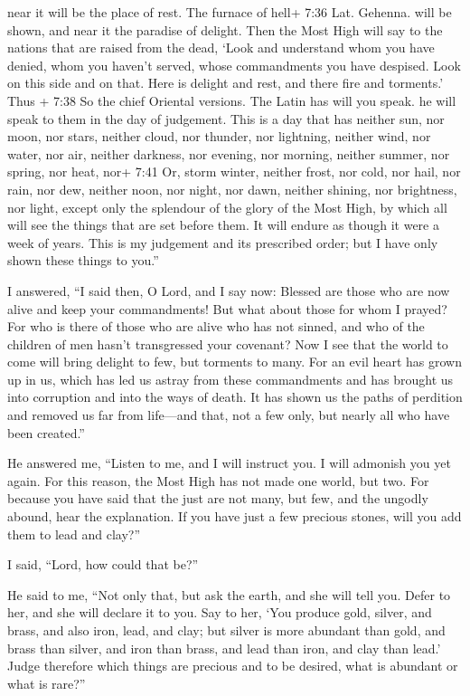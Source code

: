 near it will be the place of rest. The furnace of hell+ 7:36 Lat.
Gehenna. will be shown, and near it the paradise of delight.
 Then the Most High will say to the nations that are raised
from the dead, `Look and understand whom you have denied, whom you
haven't served, whose commandments you have despised.  Look
on this side and on that. Here is delight and rest, and there fire and
torments.' Thus + 7:38 So the chief Oriental versions. The Latin has
will you speak. he will speak to them in the day of judgement.
 This is a day that has neither sun, nor moon, nor stars,
 neither cloud, nor thunder, nor lightning, neither wind,
nor water, nor air, neither darkness, nor evening, nor morning,
 neither summer, nor spring, nor heat, nor+ 7:41 Or, storm
winter, neither frost, nor cold, nor hail, nor rain, nor dew,
 neither noon, nor night, nor dawn, neither shining, nor
brightness, nor light, except only the splendour of the glory of the
Most High, by which all will see the things that are set before them.
 It will endure as though it were a week of years.
 This is my judgement and its prescribed order; but I have
only shown these things to you.''

 I answered, ``I said then, O Lord, and I say now: Blessed
are those who are now alive and keep your commandments! 
But what about those for whom I prayed? For who is there of those who
are alive who has not sinned, and who of the children of men hasn't
transgressed your covenant?  Now I see that the world to
come will bring delight to few, but torments to many.  For
an evil heart has grown up in us, which has led us astray from these
commandments and has brought us into corruption and into the ways of
death. It has shown us the paths of perdition and removed us far from
life---and that, not a few only, but nearly all who have been created.''

 He answered me, ``Listen to me, and I will instruct you. I
will admonish you yet again.  For this reason, the Most
High has not made one world, but two.  For because you have
said that the just are not many, but few, and the ungodly abound, hear
the explanation.  If you have just a few precious stones,
will you add them to lead and clay?''

 I said, ``Lord, how could that be?''

 He said to me, ``Not only that, but ask the earth, and she
will tell you. Defer to her, and she will declare it to you.
 Say to her, `You produce gold, silver, and brass, and also
iron, lead, and clay;  but silver is more abundant than
gold, and brass than silver, and iron than brass, and lead than iron,
and clay than lead.'  Judge therefore which things are
precious and to be desired, what is abundant or what is rare?''

